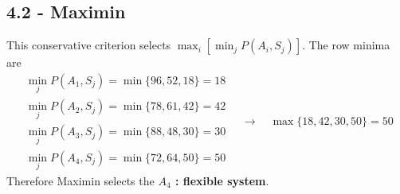 {	
	\label{subsec:warehouse-technology-c4-maximin}
	\subsection*{4.2 - Maximin }
	
	This conservative criterion selects
	\(\max_i[\min_j P(A_i,S_j)]\). The row minima are
	\[
	\begin{array}{c}
		\min_jP(A_1,S_j)=\min\{96,52,18\}=18 \\
		\min_jP(A_2,S_j)=\min\{78,61,42\}=42 \\
		\min_jP(A_3,S_j)=\min\{88,48,30\}=30 \\
		\min_jP(A_4,S_j)=\min\{72,64,50\}=50
	\end{array}
	\quad \longrightarrow \quad
	\max\{18,42,30,50\}=50
	\]
	Therefore Maximin selects the \textbf{\boldmath\(A_4\) : flexible system}.

	\vspace{-5mm}

	}



